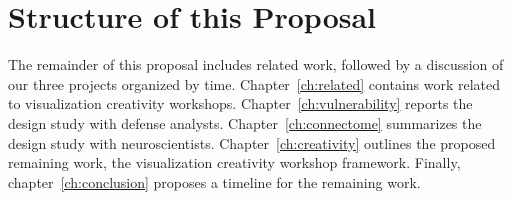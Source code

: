 \section{Structure of this Proposal}

The remainder of this proposal includes related work, followed by a discussion of our three projects organized by time. Chapter~\ref{ch:related} contains work related to visualization creativity workshops. Chapter~\ref{ch:vulnerability} reports the design study with defense analysts. Chapter~\ref{ch:connectome} summarizes the design study with neuroscientists. Chapter~\ref{ch:creativity} outlines the proposed remaining work, the visualization creativity workshop framework. Finally, chapter~\ref{ch:conclusion} proposes a timeline for the remaining work. 












